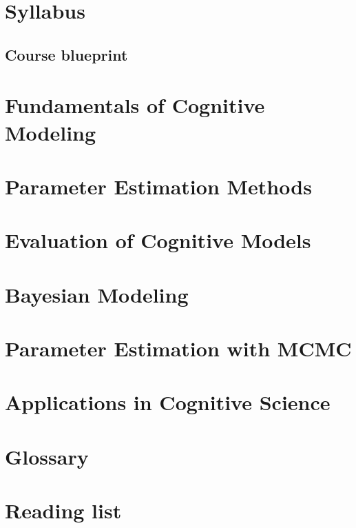 \documentclass[11pt,a4paper,openany]{book}
\begin{document}
\frontmatter\tableofcontents
\mainmatter
\chapter*{Syllabus}
\begin{landscape}
\chapter*{Course blueprint}
\end{landscape}
\chapter{Fundamentals of Cognitive Modeling}


\chapter{Parameter Estimation Methods}



\chapter{Evaluation of Cognitive Models}



\chapter{Bayesian Modeling}


\chapter{Parameter Estimation with MCMC}



\chapter{Applications in Cognitive Science}



\chapter*{Glossary}
\chapter*{Reading list}
\end{document}
